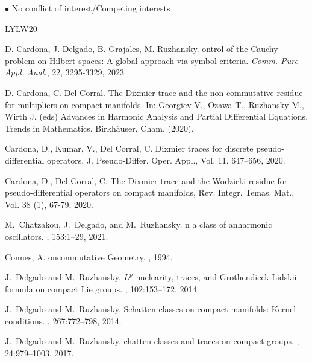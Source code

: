 \documentclass[a4paper,12pt,reqno]{amsart}
\theoremstyle{definition}
\theoremstyle{remark}
\numberwithin{equation}{section}
\begin{document}
\noindent $\bullet$ No conflict of interest/Competing interests 

	



%

%

\begin{thebibliography}{LYLW20}



D. Cardona, J. Delgado, B. Grajales, M. Ruzhansky.
ontrol of the Cauchy problem on Hilbert spaces: A global approach via symbol criteria. {\em Comm. Pure Appl. Anal.}, 22, 3295-3329, 2023

 D. Cardona, C. Del Corral. The Dixmier trace and the non-commutative residue for multipliers on compact manifolds. In: Georgiev V., Ozawa T., Ruzhansky M., Wirth J. (eds) Advances in Harmonic Analysis and Partial Differential Equations. Trends in Mathematics. Birkh\"auser, Cham, (2020).

 Cardona, D., Kumar, V., Del Corral, C. Dixmier traces for discrete pseudo-differential operators, J. Pseudo-Differ. Oper. Appl., Vol. 11, 647--656, 2020.

  Cardona, D., Del Corral, C. The Dixmier trace and the Wodzicki residue for pseudo-differential operators on compact manifolds, Rev. Integr. Temas. Mat., Vol. 38 (1), 67-79, 2020.


M.~Chatzakou, J.~Delgado, and M.~Ruzhansky.
n a class of anharmonic oscillators.
, 153:1--29, 2021.

 Connes, A. 
oncommutative Geometry.
, 1994.



J.~Delgado and M.~Ruzhansky.
\newblock ${L}^p$-nuclearity, traces, and {G}rothendieck-{L}idskii formula on
  compact {L}ie groups.
, 102:153--172, 2014.

J.~Delgado and M.~Ruzhansky.
\newblock Schatten classes on compact manifolds: {K}ernel conditions.
, 267:772--798, 2014.

J.~Delgado and M.~Ruzhansky.
chatten classes and traces on compact groups.
, 24:979--1003, 2017.


\end{thebibliography}
\end{document}
